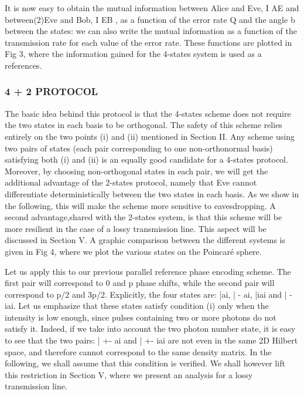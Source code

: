 It is now easy to obtain the mutual information between Alice and Eve, I AE and between(2)Eve and Bob, I EB , as a function of the error rate Q and the angle b between the states: we can also write the mutual information as a function of the transmission rate for each value of the error rate. These functions are plotted in Fig 3, where the information gained for the 4-states system is used as a references.

\subsubsection{4 + 2 PROTOCOL}

The basic idea behind this protocol is that the 4-states scheme does not require the two states in each basis to be orthogonal. The safety of this scheme relies entirely on the two points (i) and (ii) mentioned in Section II. Any scheme using two pairs of states (each pair corresponding to one non-orthonormal basis) satisfying both (i) and (ii) is an equally good candidate for a 4-states protocol. Moreover, by choosing non-orthogonal states in each pair, we will get the additional advantage of the 2-states protocol, namely that Eve cannot differentiate deterministically between the two states in each basis. As we show in the following, this will make the scheme more sensitive to eavesdropping. A second advantage,shared with the 2-states system, is that this scheme will be more resilient in the case of a lossy transmission line. This aspect will be discussed in Section V. A graphic comparison between the different systems is given in Fig 4, where we plot the various states on the Poincaré sphere.

Let us apply this to our previous parallel reference phase encoding scheme. The first pair will correspond to 0 and p phase shifts, while the second pair will correspond to p/2 and 3p/2. Explicitly, the four states are: |ai, | - ai, |iai and | - iai. Let us emphasize that these states satisfy condition (i) only when the intensity is low enough, since pulses containing two or more photons do not satisfy it. Indeed, if we take into account the two photon number state, it is easy to see that the two pairs: | +- ai and | +- iai are not even in the same 2D Hilbert space, and therefore cannot correspond to the same density matrix. In the following, we shall assume that this condition is verified. We shall however lift this restriction in Section V, where we present an analysis for a lossy transmission line.

